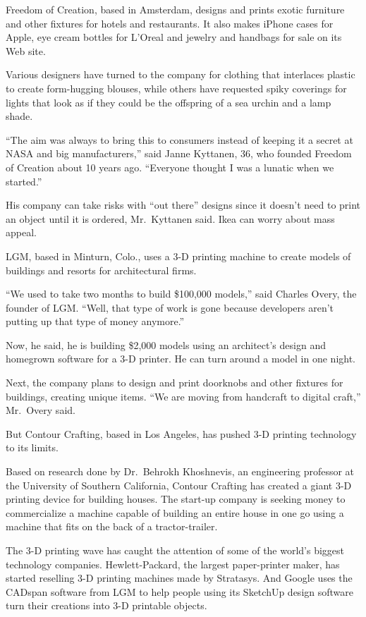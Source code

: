 ﻿\documentclass[12pt]{article}
\begin{document}
Freedom of Creation, based in Amsterdam, designs and prints exotic furniture and other fixtures for
hotels and restaurants. It also makes iPhone cases for Apple, eye cream bottles for L'Oreal and
jewelry and handbags for sale on its Web site.

Various designers have turned to the company for clothing that interlaces plastic to create
form-hugging blouses, while others have requested spiky coverings for lights that look as if they
could be the offspring of a sea urchin and a lamp shade.

``The aim was always to bring this to consumers instead of keeping it a secret at NASA and big
manufacturers,'' said Janne Kyttanen, 36, who founded Freedom of Creation about 10 years ago.
``Everyone thought I was a lunatic when we started.''

His company can take risks with ``out there'' designs since it doesn't need to print an object until
it is ordered, Mr.~Kyttanen said. Ikea can worry about mass appeal.

LGM, based in Minturn, Colo., uses a 3-D printing machine to create models of buildings and resorts
for architectural firms.

``We used to take two months to build \$100,000 models,'' said Charles Overy, the founder of LGM.
``Well, that type of work is gone because developers aren't putting up that type of money anymore.''

Now, he said, he is building \$2,000 models using an architect's design and homegrown software for a
3-D printer. He can turn around a model in one night.

Next, the company plans to design and print doorknobs and other fixtures for buildings, creating
unique items. ``We are moving from handcraft to digital craft,'' Mr.~Overy said.

But Contour Crafting, based in Los Angeles, has pushed 3-D printing technology to its limits.

Based on research done by Dr.~Behrokh Khoshnevis, an engineering professor at the University of
Southern California, Contour Crafting has created a giant 3-D printing device for building houses.
The start-up company is seeking money to commercialize a machine capable of building an entire house
in one go using a machine that fits on the back of a tractor-trailer.

The 3-D printing wave has caught the attention of some of the world's biggest technology companies.
Hewlett-Packard, the largest paper-printer maker, has started reselling 3-D printing machines made
by Stratasys. And Google uses the CADspan software from LGM to help people using its SketchUp design
software turn their creations into 3-D printable objects.
\end{document}
